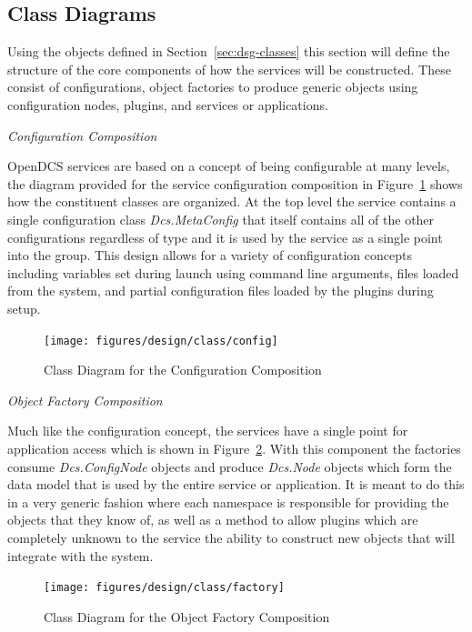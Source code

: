   \newpage

  \subsection{Class Diagrams}\label{sec:dsg-class-dia}

    Using the objects defined in Section~\ref{sec:dsg-classes} this section will
    define the structure of the core components of how the services will be
    constructed. These consist of configurations, object factories to produce
    generic objects using configuration nodes, plugins, and services or
    applications.

    \emph{Configuration Composition}

    OpenDCS services are based on a concept of being configurable at many
    levels, the diagram provided for the service configuration composition
    in Figure~\ref{fig:dsg-class-config} shows how the constituent
    classes are organized. At the top level the service contains a single
    configuration class \emph{Dcs.MetaConfig} that itself contains all of
    the other configurations regardless of type and it is used by the
    service as a single point into the group. This design allows for
    a variety of configuration concepts including variables set during
    launch using command line arguments, files loaded from the system,
    and partial configuration files loaded by the plugins during setup.

    \begin{figure}[H]
      \texttt{[image: figures/design/class/config]}
      \caption{Class Diagram for the Configuration Composition}
      \label{fig:dsg-class-config}
    \end{figure}

    \emph{Object Factory Composition}

    Much like the configuration concept, the services have a single point for
    application access which is shown in Figure~\ref{fig:dsg-class-factory}.
    With this component the factories consume \emph{Dcs.ConfigNode} objects
    and produce \emph{Dcs.Node} objects which form the data model that is used
    by the entire service or application. It is meant to do this in a very
    generic fashion where each namespace is responsible for providing the
    objects that they know of, as well as a method to allow plugins which are
    completely unknown to the service the ability to construct new objects that
    will integrate with the system.

    \begin{figure}[H]
      \texttt{[image: figures/design/class/factory]}
      \caption{Class Diagram for the Object Factory Composition}
      \label{fig:dsg-class-factory}
    \end{figure}

